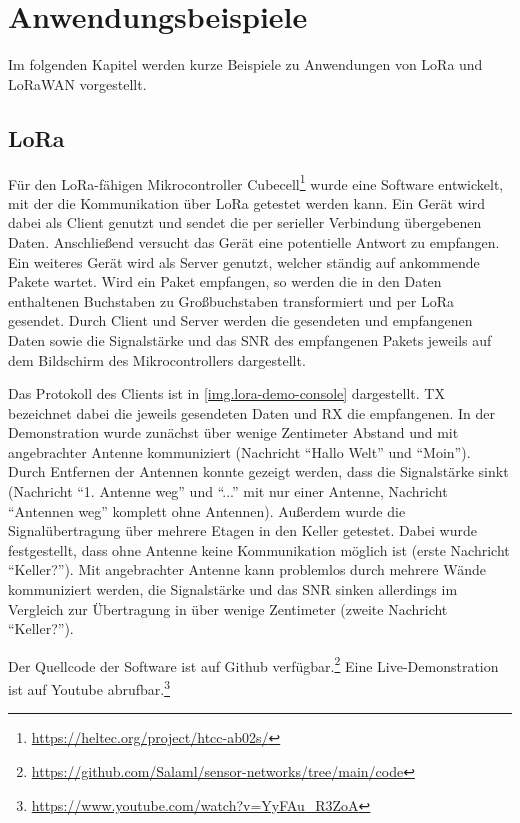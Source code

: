 \chapter{Anwendungsbeispiele}
Im folgenden Kapitel werden kurze Beispiele zu Anwendungen von LoRa und LoRaWAN vorgestellt.



\section{LoRa}
Für den LoRa-fähigen Mikrocontroller Cubecell\footnote{\url{https://heltec.org/project/htcc-ab02s/}} wurde eine Software entwickelt, mit der die Kommunikation über LoRa getestet werden kann.
Ein Gerät wird dabei als Client genutzt und sendet die per serieller Verbindung übergebenen Daten.
Anschließend versucht das Gerät eine potentielle Antwort zu empfangen.
Ein weiteres Gerät wird als Server genutzt, welcher ständig auf ankommende Pakete wartet.
Wird ein Paket empfangen, so werden die in den Daten enthaltenen Buchstaben zu Großbuchstaben transformiert und per LoRa gesendet.
Durch Client und Server werden die gesendeten und empfangenen Daten sowie die Signalstärke und das \gls{SNR} des empfangenen Pakets jeweils auf dem Bildschirm des Mikrocontrollers dargestellt.

Das Protokoll des Clients ist in \autoref{img.lora-demo-console} dargestellt.
TX bezeichnet dabei die jeweils gesendeten Daten und RX die empfangenen.
In der Demonstration wurde zunächst über wenige Zentimeter Abstand und mit angebrachter Antenne kommuniziert (Nachricht "`Hallo Welt"' und "`Moin"').
Durch Entfernen der Antennen konnte gezeigt werden, dass die Signalstärke  sinkt (Nachricht "`1. Antenne weg"' und "`..."' mit nur einer Antenne, Nachricht "`Antennen weg"' komplett ohne Antennen).
Außerdem wurde die Signalübertragung über mehrere Etagen in den Keller getestet.
Dabei wurde festgestellt, dass ohne Antenne keine Kommunikation möglich ist (erste Nachricht "`Keller?"').
Mit angebrachter Antenne kann problemlos durch mehrere Wände kommuniziert werden, die Signalstärke und das \gls{SNR} sinken allerdings im Vergleich zur Übertragung in über wenige Zentimeter (zweite Nachricht "`Keller?"').

Der Quellcode der Software ist auf Github verfügbar.\footnote{\url{https://github.com/Salaml/sensor-networks/tree/main/code}}
Eine Live-Demonstration ist auf Youtube abrufbar.\footnote{\url{https://www.youtube.com/watch?v=YyFAu_R3ZoA}}



